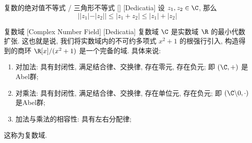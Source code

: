 \documentclass[UTF8]{ctexart}
\begin{document}
\begin{ppt}
    [UUID]
    {复数的绝对值不等式 / 三角形不等式}
    []
    [Dedicatia]
    设 \( z_1,z_2\in\C \), 那么
    \[||z_1|-|z_2||\leq|z_1+z_2|\leq|z_1|+|z_2|\]
\end{ppt}
\begin{dfn}
    [UUID]
    {复数域}
    [Complex Number Field]
    [Dedicatia]
    复数域 \( \C \) 是实数域 \( \R \) 的最小代数扩张. 这也就是说, 我们将实数域内的不可约多项式 \( x^2+1 \) 的根强行引入, 构造得到的商环 \( \R[x]/(x^2+1) \) 是一个完备的域. 具体来说: 
    \begin{enumerate}
        \item 对加法: 具有封闭性, 满足结合律、交换律, 存在零元, 存在负元; 即 \( (\C,+) \) 是Abel群; 
        \item 对乘法: 具有封闭性, 满足结合律、交换律, 存在单位元, 存在负元; 即 \( (\C\backslash 0,\cdot) \) 是Abel群; 
        \item 加法与乘法的相容性: 具有左右分配律; 
    \end{enumerate}
    这称为复数域. 
\end{dfn}
\end{document}
